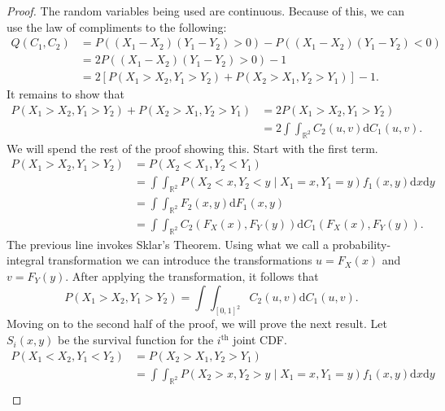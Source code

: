\begin{proof}
    The random variables being used are continuous. Because of this, we can use the law of compliments to the following:
    \begin{align*}
        Q\left(C_1,C_2\right)&=P\left(\left(X_1-X_2\right)\left(Y_1-Y_2\right)>0\right)-P\left(\left(X_1-X_2\right)\left(Y_1-Y_2\right)<0\right)\\
        &=2P\left(\left(X_1-X_2\right)\left(Y_1-Y_2\right)>0\right)-1\\
        &=2\left[P\left(X_1>X_2,Y_1>Y_2\right)+P\left(X_2>X_1,Y_2>Y_1\right)\right]-1.
    \end{align*}
    It remains to show that 
    \begin{align*}
        P\left(X_1>X_2,Y_1>Y_2\right)+P\left(X_2>X_1,Y_2>Y_1\right)&=2P\left(X_1>X_2,Y_1>Y_2\right)\\
        &=2\int\int_{\mathbb{R}^2}C_2\left(u,v\right)\mathrm{d}C_1\left(u,v\right).
    \end{align*}
    We will spend the rest of the proof showing this. Start with the first term.
    \begin{align*}
        P\left(X_1>X_2,Y_1>Y_2\right)&=P\left(X_2<X_1,Y_2<Y_1\right)\\
        &=\int\int_{\mathbb{R}^2}P\left(X_2<x,Y_2<y\; |\; X_1=x,Y_1=y\right)f_1\left(x,y\right)\mathrm{d}x\mathrm{d}y\\
        &=\int\int_{\mathbb{R}^2}F_2\left(x,y\right)\mathrm{d}F_1\left(x,y\right)\\
        &=\int\int_{\mathbb{R}^2}C_2\left(F_X\left(x\right),F_Y\left(y\right)\right)\mathrm{d}C_1\left(F_X\left(x\right),F_Y\left(y\right)\right).
    \end{align*}
    The previous line invokes Sklar's Theorem. Using what we call a probability-integral transformation \cite{angus1994} we can introduce the transformations $u=F_X\left(x\right)$ and $v=F_Y\left(y\right)$. After applying the transformation, it follows that $$P\left(X_1>X_2,Y_1>Y_2\right)=\int\int_{[0,1]^2}C_2\left(u,v\right)\mathrm{d}C_1\left(u,v\right).$$
    Moving on to the second half of the proof, we will prove the next result. Let $S_i\left(x,y\right)$ be the survival function for the $i^{\text{th}}$ joint CDF.
    \begin{align*}
        P\left(X_1<X_2,Y_1<Y_2\right)&=P\left(X_2>X_1,Y_2>Y_1\right)\\
        &=\int\int_{\mathbb{R}^2}P\left(X_2>x,Y_2>y\; |\; X_1=x,Y_1=y\right)f_1\left(x,y\right)\mathrm{d}x\mathrm{d}y\\

\end{align*}
\end{proof}
